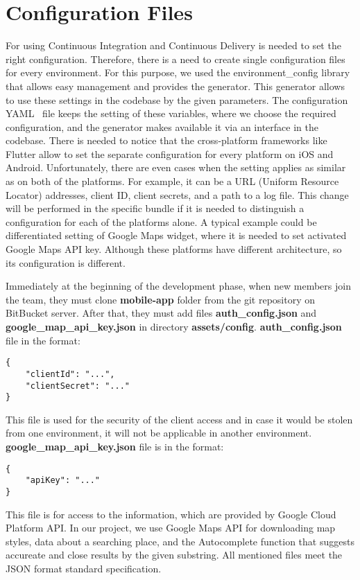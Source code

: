 \newpage
\section{Configuration Files}\label{sec:configuration-files}

For using Continuous Integration and Continuous Delivery is needed to set the right configuration.
Therefore, there is a need to create single configuration files for every environment.
For this purpose, we used the environment\_config library that allows easy management and provides the generator.
This generator allows to use these settings in the codebase by the given parameters.
The configuration YAML~\cite{yaml} file keeps the setting of these variables, where we choose the required configuration, and the generator makes available it via an interface in the codebase.
There is needed to notice that the cross-platform frameworks like Flutter allow to set the separate configuration for every platform on iOS and Android.
Unfortunately, there are even cases when the setting applies as similar as on both of the platforms.
For example, it can be a URL (Uniform Resource Locator) addresses, client ID, client secrets, and a path to a log file.
This change will be performed in the specific bundle if it is needed to distinguish a configuration for each of the platforms alone.
A typical example could be differentiated setting of Google Maps widget, where it is needed to set activated Google Maps API key.
Although these platforms have different architecture, so its configuration is different.

Immediately at the beginning of the development phase, when new members join the team, they must clone \textbf{mobile-app} folder from the git repository on BitBucket server.
After that, they must add files \textbf{auth\_config.json} and \textbf{google\_map\_api\_key.json} in directory \textbf{assets/config}.
\newline
\newline
\textbf{auth\_config.json} file in the format:
\begin{verbatim}
{
    "clientId": "...",
    "clientSecret": "..."
}
\end{verbatim}
This file is used for the security of the client access and in case it would be stolen from one environment, it will not be applicable in another environment.
\newline
\newline
\textbf{google\_map\_api\_key.json} file is in the format:
\begin{verbatim}
{
    "apiKey": "..."
}
\end{verbatim}
This file is for access to the information, which are provided by Google Cloud Platform API.
In our project, we use Google Maps API for downloading map styles, data about a searching place, and the Autocomplete function that suggests accureate and close results by the given substring.
All mentioned files meet the JSON format standard specification.


